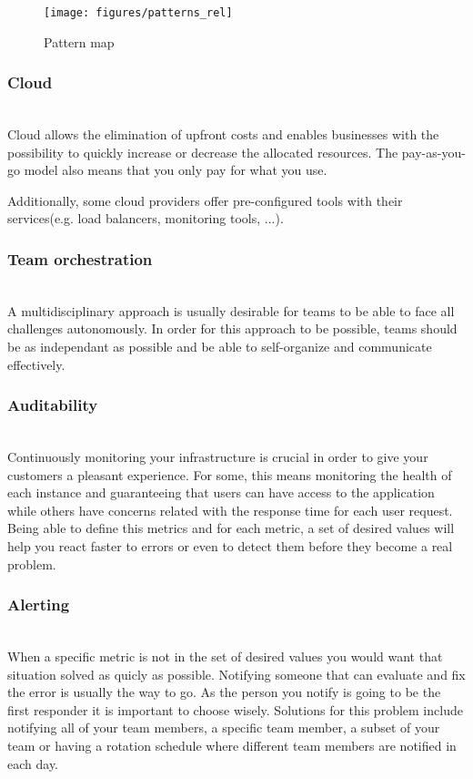 \documentclass{llncs}
\begin{document}
  \begin{figure}[ht]
    \centering \texttt{[image: figures/patterns\_rel]}
    \caption{Pattern map}
    \label{fig:rel_patterns}
  \end{figure}


    \subsubsection{Cloud}~\\
    Cloud allows the elimination of upfront costs and enables businesses with the possibility to quickly increase or decrease the allocated resources. The pay-as-you-go model also means that you only pay for what you use.

    Additionally, some cloud providers offer pre-configured tools with their services(e.g. load balancers, monitoring tools, ...).
    \subsubsection{Team orchestration}~\\

    A multidisciplinary approach is usually desirable for teams to be able to face all challenges autonomously. In order for this approach to be possible, teams should be as independant as possible and be able to self-organize and communicate effectively.
    \subsubsection{Auditability}~\\
    Continuously monitoring your infrastructure is crucial in order to give your customers a pleasant experience. For some, this means monitoring the health of each instance and guaranteeing that users can have access to the application while others have concerns related with the response time for each user request. Being able to define this metrics and for each metric, a set of desired values will help you react faster to errors or even to detect them before they become a real problem.
    \subsubsection{Alerting}~\\
    When a specific metric is not in the set of desired values you would want that situation solved as quicly as possible. Notifying someone that can evaluate and fix the error is usually the way to go. As the person you notify is going to be the first responder it is important to choose wisely.
    Solutions for this problem include notifying all of your team members, a specific team member, a subset of your team or having a rotation schedule where different team members are notified in each day.
\end{document}
